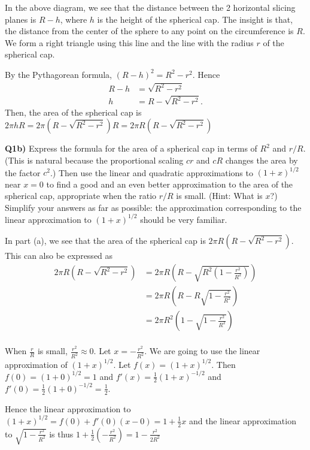 \documentclass[9pt]{article}
\begin{document}
In the above diagram, we see that the distance between the 2 horizontal slicing planes is $R - h$, where $h$ is the height of the spherical cap. The insight is that, the distance from the center of the sphere to any point on the circumference is $R$. We form a right triangle using this line and the line with the radius $r$ of the spherical cap.

By the Pythagorean formula, $(R - h)^2 = R^2 - r^2$. Hence
\begin{align*}
  R - h &= \sqrt{R^2 - r^2}\\
  h &= R - \sqrt{R^2 - r^2}.
\end{align*}
Then, the area of the spherical cap is $2 \pi h R = 2 \pi (R - \sqrt{R^2 - r^2}) R = 2 \pi R (R - \sqrt{R^2 - r^2})$


\begin{tcolorbox}
  \textbf{Q1b)} Express the formula for the area of a spherical cap in terms of $R^2$ and $r / R$. (This is natural because the proportional scaling $cr$ and $cR$ changes the area by the factor $c^2$.) Then use the linear and quadratic approximations to $(1 + x)^{1/2}$ near $x = 0$ to find a good and an even better approximation to the area of the spherical cap, appropriate when the ratio $r / R$ is small. (Hint: What is $x$?) Simplify your answers as far as possible: the approximation corresponding to the linear approximation to $(1 + x)^{1/2}$ should be very familiar.
\end{tcolorbox}

In part (a), we see that the area of the spherical cap is $2 \pi R (R - \sqrt{R^2 - r^2})$. This can also be expressed as
\begin{align*}
  2 \pi R (R - \sqrt{R^2 - r^2}) &= 2 \pi R (R - \sqrt{R^2 (1 - \frac{r^2}{R^2})}) \\
                                 &= 2 \pi R (R - R \sqrt{1 - \frac{r^2}{R^2}}) \\
                                 &= 2 \pi R^2 (1 - \sqrt{1 - \frac{r^2}{R^2}}) \\
\end{align*}

When $\frac{r}{R}$ is small, $\frac{r^2}{R^2} \approx 0$. Let $x = -\frac{r^2}{R^2}$. We are going to use the linear approximation of $(1 + x)^{1/2}$. Let $f(x) = (1 + x)^{1/2}$. Then $f(0) = (1 + 0)^{1/2} = 1$ and $f'(x) = \frac{1}{2} (1 + x)^{-1/2}$ and $f'(0) = \frac{1}{2}(1 + 0)^{-1/2} = \frac{1}{2}$.

Hence the linear approximation to $(1 + x)^{1/2} = f(0) + f'(0)(x - 0) = 1 + \frac{1}{2}x$ and the linear approximation to $\sqrt{1 - \frac{r^2}{R^2}}$ is thus $1 + \frac{1}{2}(-\frac{r^2}{R^2}) = 1 - \frac{r^2}{2R^2}$
\end{document}
